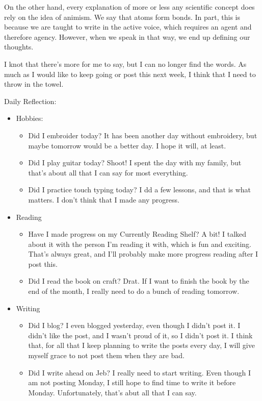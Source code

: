 \documentclass[12pt]{article}[titlepage]
\newcommand{\1}{\={a}}
\newcommand{\2}{\={e}}
\newcommand{\3}{\={\i}}
\newcommand{\4}{\=o}
\newcommand{\5}{\=u}
\newcommand{\6}{\={A}}
\renewcommand{\,}{\textsuperscript{,}}
\begin{document}
On the other hand, every explanation of more or less any scientific concept does rely on the idea of animism.
We say that atoms form bonds.
In part, this is because we are taught to write in the active voice, which requires an agent and therefore agency.
However, when we speak in that way, we end up defining our thoughts.

I knot that there's more for me to say, but I can no longer find the words.
As much as I would like to keep going or post this next week, I think that I need to throw in the towel.

Daily Reflection:
\begin{itemize}
\item Hobbies:
\begin{itemize}
\item Did I embroider today? It has been another day without embroidery, but maybe tomorrow would be a better day. I hope it will, at least.
\item Did I play guitar today? Shoot! I spent the day with my family, but that's about all that I can say for most everything.
\item Did I practice touch typing today? I dd a few lessons, and that is what matters. I don't think that I made any progress.
\end{itemize}
\item Reading
\begin{itemize}
\item Have I made progress on my Currently Reading Shelf? A bit! I talked about it with the person I'm reading it with, which is fun and exciting.
That's always great, and I'll probably make more progress reading after I post this.
\item Did I read the book on craft? Drat. If I want to finish the book by the end of the month, I really need to do a bunch of reading tomorrow.
\end{itemize}
\item Writing
\begin{itemize}
\item Did I blog? I even blogged yesterday, even though I didn't post it. I didn't like the post, and I wasn't proud of it, so I didn't post it.
I think that, for all that I keep planning to write the posts every day, I will give myself grace to not post them when they are bad.
\item Did I write ahead on Jeb? I really need to start writing. Even though I am not posting Monday, I still hope to find time to write it before Monday.
Unfortunately, that's abut all that I can say.

\end{itemize}
\end{itemize}
\end{document}
